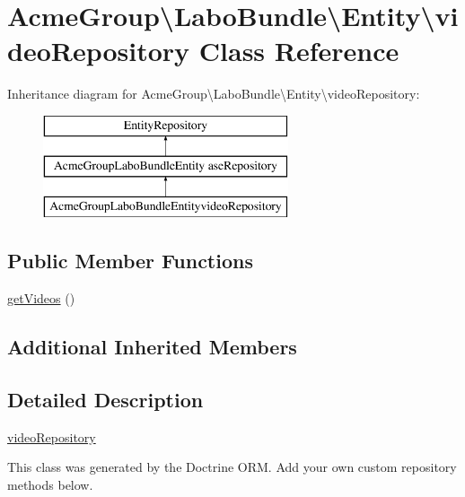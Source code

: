 \hypertarget{class_acme_group_1_1_labo_bundle_1_1_entity_1_1video_repository}{\section{Acme\+Group\textbackslash{}Labo\+Bundle\textbackslash{}Entity\textbackslash{}video\+Repository Class Reference}
\label{class_acme_group_1_1_labo_bundle_1_1_entity_1_1video_repository}
}
Inheritance diagram for Acme\+Group\textbackslash{}Labo\+Bundle\textbackslash{}Entity\textbackslash{}video\+Repository\+:\begin{figure}[H]
\begin{center}
\leavevmode
\includegraphics[height=3.000000cm]{class_acme_group_1_1_labo_bundle_1_1_entity_1_1video_repository}
\end{center}
\end{figure}
\subsection*{Public Member Functions}
\begin{DoxyCompactItemize}
\item 
\hyperlink{class_acme_group_1_1_labo_bundle_1_1_entity_1_1video_repository_a693d764eb3abcafb20ae48f72caee7a5}{get\+Videos} ()
\end{DoxyCompactItemize}
\subsection*{Additional Inherited Members}


\subsection{Detailed Description}
\hyperlink{class_acme_group_1_1_labo_bundle_1_1_entity_1_1video_repository}{video\+Repository}

This class was generated by the Doctrine O\+R\+M. Add your own custom repository methods below. 

